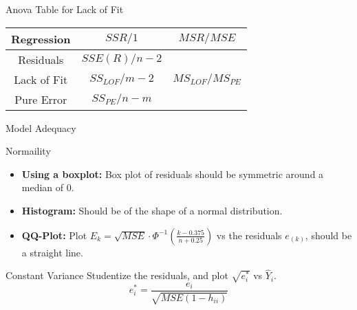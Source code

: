 \documentclass{article}
\begin{document}
\begin{multicols*}{3}
\begin{blackbox}{Anova Table for Lack of Fit}
\begin{center}
\begin{tabular}{|c|c|c|}
                \hline 
                \hline 
                Regression & $SSR/1$ & $MSR/MSE$ \\
                \hline
                Residuals & $SSE(R)/n-2$ & \\
                \hline
                Lack of Fit & $SS_{LOF}/m-2$ & $MS_{LOF}/MS_{PE}$\\
                \hline
                Pure Error & $SS_{PE}/n-m$ & \\
                \hline
            \end{tabular}
        \end{center}
    \end{blackbox}
    \begin{blackbox}{Model Adequacy}
        \begin{pinkbox}{Normaility}
            
                \begin{itemize}[leftmargin=7pt]
                    \item \textbf{Using a boxplot:} Box plot of residuals should be symmetric around a median of 0.
                    \item \textbf{Histogram:} Should be of the shape of a normal distribution.
                    \item \textbf{QQ-Plot:} Plot $E_k = \sqrt{MSE}\cdot\Phi^{-1}\left(\frac{k-0.375}{n + 0.25}\right)$ vs the residuals $e_{(k)}$, should be a straight line.
                \end{itemize}
        \end{pinkbox}
        \begin{redbox}{Constant Variance}
            Studentize the residuals, and plot $\sqrt{e_i^*}$ vs $\hat{Y}_i$.\\[-0.25ex]
            \[e_i^* = \frac{e_i}{\sqrt{MSE(1-h_{ii})}}\]
            

\end{redbox}
\end{blackbox}
\end{multicols*}
\end{document}
